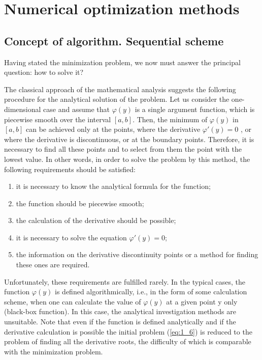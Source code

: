 \section{Numerical optimization methods}
\label{sec:1_2}

\subsection {Concept of algorithm. Sequential scheme}
\label {subsec:1.2.1}

Having stated the minimization problem, we now must answer the principal question: how to solve it?

The classical approach of the mathematical analysis suggests the following procedure for the analytical solution of the problem. Let us consider the one-dimensional case and assume that $\varphi(y)$ is a single argument function, which is piecewise smooth over the interval $[a,b]$. Then, the minimum of $\varphi(y)$ in $[a,b]$ can be achieved only at the points, where the derivative $\varphi'(y)=0$ , or where the derivative is discontinuous, or at the boundary points. Therefore, it is necessary to find all these points and to select from them the point with the lowest value. In other words, in order to solve the problem by this method, the following requirements should be satisfied:
\begin{enumerate}
\item{it is necessary to know the analytical formula for the function;}
\item{the function should be piecewise smooth;}
\item{the calculation of the derivative should be possible;}
\item{it is necessary to solve the equation $\varphi'(y)=0$;}
\item{the information on the derivative discontinuity points or a method for finding these ones are required.}
\end{enumerate}

Unfortunately, these requirements are fulfilled rarely. In the typical cases, the function $\varphi(y)$ is defined algorithmically, i.e., in the form of some calculation scheme, when one can calculate the value of $\varphi(y)$ at a given point y only (black-box function). In this case, the analytical investigation methods are unsuitable. Note that even if the function is defined analytically and if the derivative calculation is possible the initial problem (\ref{eq:1_6}) is reduced to the problem of finding all the derivative roots, the difficulty of which is comparable with the minimization problem.

